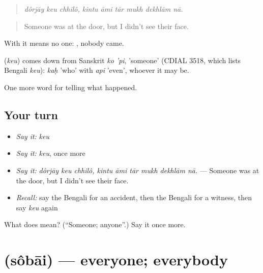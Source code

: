 \begin{quote}
\emph{dôrjāy keu chhilô, kintu āmi tār mukh dekhlām nā.}
\end{quote}

\begin{quote}
Someone was at the door, but I didn't see their face.
\end{quote}

With  it means no one:   , nobody came.

\begin{cousinweb}
\textbf{} (\emph{keu}) comes down from Sanskrit \emph{ko 'pi}, 'someone' (CDIAL 3518, which lists Bengali \emph{keu}): \emph{kaḥ} 'who' with \emph{api} 'even', whoever it may be.
\end{cousinweb}

\begin{grammarlens}[title={What you've built}]
One more word for telling what happened.
\end{grammarlens}

\subsection*{Your turn}
\begin{itemize}
\raggedright
  \item \emph{Say it:} \emph{keu}
  \item \emph{Say it:} \emph{keu}, once more
  \item \emph{Say it:} \emph{dôrjāy keu chhilô, kintu āmi tār mukh dekhlām nā.} — Someone was at the door, but I didn't see their face.
  \item \emph{Recall:} say the Bengali for an accident, then the Bengali for a witness, then say \emph{keu} again
\end{itemize}

\begin{tcolorbox}[breakable,colback=teal!4,colframe=teal!35!black,title={Before you move on}]
What does  mean? (\textquotedblleft{}Someone; anyone\textquotedblright{}.) Say it once more.
\end{tcolorbox}
\section[\texorpdfstring{\bn{সবাই} (sôbāi)}{সবাই (sôbāi)}]{ (sôbāi) — everyone; everybody}

\label{lesson:BN-C277-sobai}



